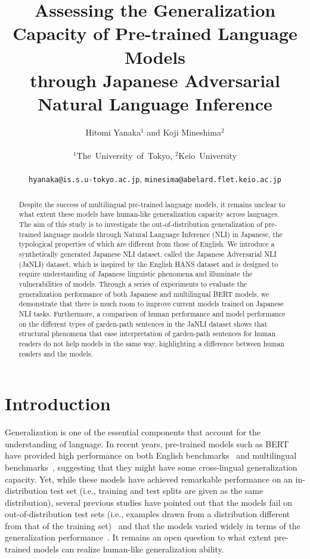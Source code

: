 \documentclass[11pt]{article}
\title{Assessing the Generalization Capacity of Pre-trained Language Models\\through Japanese Adversarial Natural Language Inference}
\author{
  \parbox{\linewidth}{\centering
   Hitomi Yanaka$^1$ and
   Koji Mineshima$^2$
  }
  \\
   $^1$\mbox{\rm The University of Tokyo,}
   $^2$\mbox{\rm Keio University}
  \\
  \parbox{\linewidth}{\centering
   {\tt hyanaka@is.s.u-tokyo.ac.jp},
   {\tt minesima@abelard.flet.keio.ac.jp}
   }
}
\begin{document}
\maketitle
\begin{abstract}
Despite the success of multilingual pre-trained language models, it remains unclear to what extent these models have human-like generalization capacity across languages. The aim of this study is to investigate the out-of-distribution generalization of pre-trained language models through Natural Language Inference (NLI) in Japanese, the typological properties of which are different from those of English. We introduce a synthetically generated Japanese NLI dataset, called the Japanese Adversarial NLI (JaNLI) dataset, which is inspired by the English HANS dataset and is designed to require understanding of Japanese linguistic phenomena and illuminate the vulnerabilities of models. Through a series of experiments to evaluate the generalization performance of both Japanese and multilingual BERT models, we demonstrate that there is much room to improve current models trained on Japanese NLI tasks. Furthermore, a comparison of human performance and model performance on the different types of garden-path sentences in the JaNLI dataset shows that structural phenomena that ease interpretation of garden-path sentences for human readers do not help models in the same way, highlighting a difference between human readers and the models.
\end{abstract}

\section{Introduction}
\label{sec:intro}
Generalization is one of the essential components that account for the understanding of language.
In recent years, pre-trained 
models such as BERT~\cite{devlin-etal-2019-bert} have provided high performance on both English
benchmarks~\cite{NIPS2019_8589} and multilingual
benchmarks~\cite{liang-etal-2020-xglue}, suggesting that they might have some cross-lingual generalization capacity.
Yet, while these models have achieved remarkable performance on an in-distribution test set (i.e., training and test splits are given as the same distribution), several previous studies have pointed out that the models fail on out-of-distribution test sets (i.e., examples drawn from a distribution different from that of the training set)~\cite{marvin-linzen-2018-targeted,mccoy-etal-2019-right} and that the models varied widely in terms of the generalization performance~\cite{mccoy-etal-2020-berts,yanaka-etal-2020-neural}.
It remains an open question to what extent pre-trained models can realize human-like generalization ability.
\end{document}
